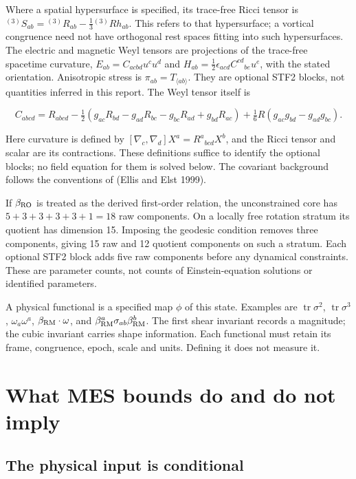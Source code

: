 \documentclass[
  11pt,
  a4paper]{article}
\begin{document}
Where a spatial hypersurface is specified, its trace-free Ricci tensor is \({}^{(3)}S_{ab}={}^{(3)}R_{ab}-\tfrac13{}^{(3)}R h_{ab}\). This refers to that hypersurface; a vortical congruence need not have orthogonal rest spaces fitting into such hypersurfaces. The electric and magnetic Weyl tensors are projections of the trace-free spacetime curvature, \(E_{ab}=C_{acbd}u^cu^d\) and \(H_{ab}=\tfrac12\epsilon_{acd}C^{cd}{}_{be}u^e\), with the stated orientation. Anisotropic stress is \(\pi_{ab}=T_{\langle ab\rangle}\). They are optional STF2 blocks, not quantities inferred in this report. The Weyl tensor itself is

\[
C_{abcd}=R_{abcd}-\tfrac12(g_{ac}R_{bd}-g_{ad}R_{bc}-g_{bc}R_{ad}+g_{bd}R_{ac})
+\tfrac16R(g_{ac}g_{bd}-g_{ad}g_{bc}).
\tag{5.8}
\]

Here curvature is defined by \([\nabla_c,\nabla_d]X^a=R^a{}_{bcd}X^b\), and the Ricci tensor and scalar are its contractions. These definitions suffice to identify the optional blocks; no field equation for them is solved below. The covariant background follows the conventions of (Ellis and Elst 1999).

If \(\beta_{\rm RO}\) is treated as the derived first-order relation, the unconstrained core has
\(5+3+3+3+3+1=18\) raw components. On a locally free rotation stratum its quotient has dimension 15. Imposing the geodesic condition removes three components, giving 15 raw and 12 quotient components on such a stratum. Each optional STF2 block adds five raw components before any dynamical constraints. These are parameter counts, not counts of Einstein-equation solutions or identified parameters.

A physical functional is a specified map \(\phi\) of this state. Examples are \(\operatorname{tr}\sigma^2\), \(\operatorname{tr}\sigma^3\), \(\omega_a\omega^a\), \(\beta_{\rm RM}\cdot\omega\), and \(\beta_{\rm RM}^a\sigma_{ab}\beta_{\rm RM}^b\). The first shear invariant records a magnitude; the cubic invariant carries shape information. Each functional must retain its frame, congruence, epoch, scale and units. Defining it does not measure it.

\hypertarget{what-mes-bounds-do-and-do-not-imply}{%
\section{What MES bounds do and do not imply}\label{what-mes-bounds-do-and-do-not-imply}}

\hypertarget{the-physical-input-is-conditional}{%
\subsection{The physical input is conditional}\label{the-physical-input-is-conditional}}
\end{document}
